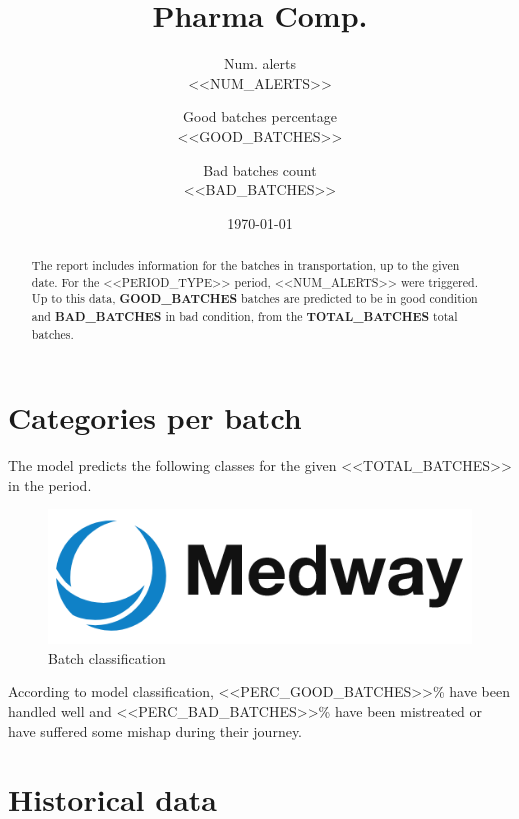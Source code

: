 \documentclass[daily]{engenius}
\title{Pharma Comp.}
\author{Num. alerts \\ {<<NUM_ALERTS>>}
	\and Good batches percentage \\ {<<GOOD_BATCHES>>}
    \and Bad batches count \\ {<<BAD_BATCHES>>}
    }
\date{\today}
\begin{document}
\maketitle

\begin{abstract}

The report includes information for the batches in transportation, up to the given date. For the {<<PERIOD_TYPE>>} period, {<<NUM_ALERTS>>} were triggered. Up to this data, \textbf{GOOD\_BATCHES} batches are predicted to be in good condition and \textbf{BAD\_BATCHES} in bad condition, from the \textbf{TOTAL\_BATCHES} total batches.

\end{abstract}


\section{Categories per batch}
The model predicts the following classes for the given {<<TOTAL_BATCHES>>} in the period.

\begin{figure}[!ht]
    \begin{center}
        \includegraphics[width=\textwidth/3]{./images/logo2.png}
        \caption{Batch classification}
        \label{img:engeniuslogo}
    \end{center}
\end{figure}

According to model classification, {<<PERC_GOOD_BATCHES>>}\% have been handled well and {<<PERC_BAD_BATCHES>>}\% have been mistreated or have suffered some mishap during their journey.


\section{Historical data}
\end{document}

